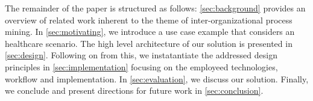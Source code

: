 The remainder of the paper is structured as follows: \cref{sec:background} provides an overview of related work inherent to the theme of inter-organizational process mining. In \cref{sec:motivating}, we introduce a use case example that considers an healthcare scenario. The high level architecture of our solution is presented in \cref{sec:design}. Following on from this, we instatantiate the addressed design principles in \cref{sec:implementation} focusing on the employeed technologies, workflow and implementation. In \cref{sec:evaluation}, we discuss our solution. Finally, we conclude and present directions for future work in \cref{sec:conclusion}.





\label{sec:introduction}